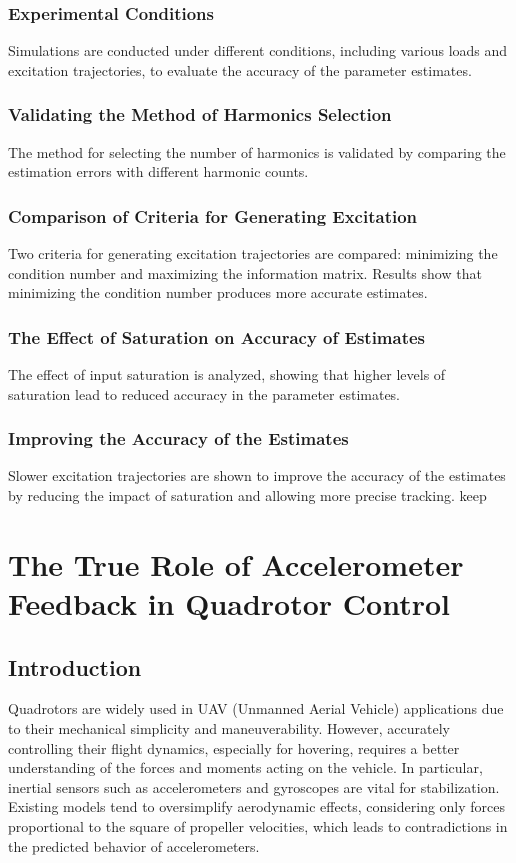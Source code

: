 \documentclass[a4paper,12pt]{article}
\begin{document}
\subsubsection{Experimental Conditions}
Simulations are conducted under different conditions, including various loads and excitation trajectories, to evaluate the accuracy of the parameter estimates.
\subsubsection{Validating the Method of Harmonics Selection}
The method for selecting the number of harmonics is validated by comparing the estimation errors with different harmonic counts.
\subsubsection{Comparison of Criteria for Generating Excitation}
Two criteria for generating excitation trajectories are compared: minimizing the condition number and maximizing the information matrix. Results show that minimizing the condition number produces more accurate estimates.
\subsubsection{The Effect of Saturation on Accuracy of Estimates}
The effect of input saturation is analyzed, showing that higher levels of saturation lead to reduced accuracy in the parameter estimates.
\subsubsection{Improving the Accuracy of the Estimates}
Slower excitation trajectories are shown to improve the accuracy of the estimates by reducing the impact of saturation and allowing more precise tracking.
keep

\section{The True Role of Accelerometer Feedback in Quadrotor Control}

\subsection{Introduction}
Quadrotors are widely used in UAV (Unmanned Aerial Vehicle) applications due to their mechanical simplicity and maneuverability. However, accurately controlling their flight dynamics, especially for hovering, requires a better understanding of the forces and moments acting on the vehicle. In particular, inertial sensors such as accelerometers and gyroscopes are vital for stabilization. Existing models tend to oversimplify aerodynamic effects, considering only forces proportional to the square of propeller velocities, which leads to contradictions in the predicted behavior of accelerometers.
\end{document}
